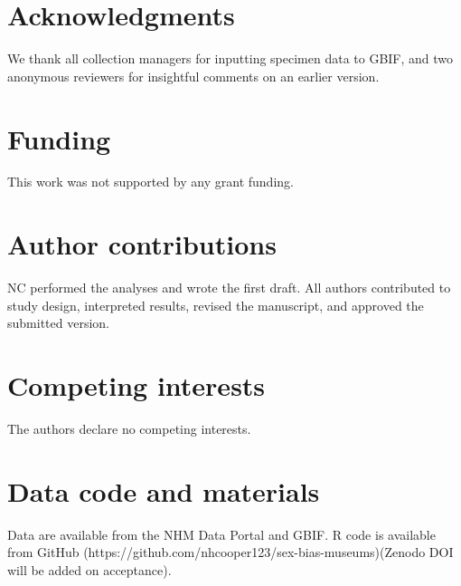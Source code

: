 \documentclass[a4paper, 12pt]{article}
\begin{document}
\section{Acknowledgments}
We thank all collection managers for inputting specimen data to GBIF, and two anonymous reviewers for insightful comments on an earlier version.

\section{Funding}
This work was not supported by any grant funding.




\section{Author contributions}
NC performed the analyses and wrote the first draft. All authors contributed to study design, interpreted results, revised the manuscript, and approved the submitted version.

\section{Competing interests}
The authors declare no competing interests.

\section{Data code and materials}\label{data-code-and-materials}
Data are available from the NHM Data Portal \cite{sex-bias-data} and GBIF. 
R code is available from GitHub (https://github.com/nhcooper123/sex-bias-museums)(Zenodo DOI will be added on acceptance).
\end{document}
